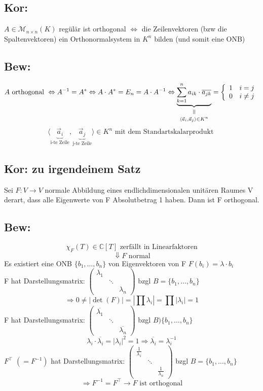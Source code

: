 \documentclass[titlepage,12pt,a4paper,ngerman]{report}
\newcommand{\verteq}{\rotatebox{90}{$\,=$}}
\newcommand{\equalto}[2]{\underset{\scriptstyle\overset{\mkern4mu\verteq}{#2}}{#1}}
\newcommand{\tx}[1]{\textrm{#1}}
\newcommand{\ub}[1]{\underbrace{#1}}
\newcommand{\basis}[3]{\{#1_{#2}, \dots, #1_{#3}\}}
\newcommand{\casess}[4]{\left\{ \begin{array}{ll} {#1} & {#2} \\ {#3} & {#4} \end{array} \right.}
\newcommand{\ska}[2]{\langle #1 , #2 \rangle}
\begin{document}
\subsection{Kor:}
$ A \in \mathcal{M}_{n \times n} (K) $ regülär ist orthogonal $ \Leftrightarrow $ die  Zeilenvektoren (bzw die Spaltenvektoren) ein Orthonormalsystem in $ K^n $ bilden (und somit eine ONB)
\subsection{Bew:}
$$ A \tx{ orthogonal } \Leftrightarrow A^{-1} = A^* \Leftrightarrow A \cdot A^* = E_n = A \cdot A^{-1} \Leftrightarrow \equalto{\ub{\sum_{k=1}^{n} a_{ik} \cdot \overline{a_{jk}}}}{\ska{\vec{a}_i}{\vec{a}_j} \in K^n} = \casess{1}{i=j}{0}{i\neq j} $$
$$\ska{\ub{\vec{a}_i}_{\tx{i-te Zeile}}}{\ub{\vec{a}_j}_{\tx{j-te Zeile}}} \in K^n \tx{ mit dem Standartskalarprodukt } $$
\subsection{Kor: zu irgendeinem Satz}
Sei $ F: V \to V $ normale Abbildung eines endlichdimensionalen unitären Raumes V derart, dass alle Eigenwerte von F Absolutbetrag 1 haben. Dann ist F orthogonal.

\subsection{Bew:}
$$ \chi_{F}(T) \in \mathbb{C} [T] \tx{ zerfällt in Linearfaktoren}$$
$$\Downarrow F \tx{ normal}$$
Es existiert eine ONB $ \basis{b}{1}{n} $ von Eigenvektoren von F $ F(b_i) = \lambda \cdot b_i $\\[5pt]
F hat Darstellungsmatrix:
$\begin{pmatrix}
\lambda_1\\
& \ddots \\
& & \lambda_n
\end{pmatrix} $
bzgl $ B = \basis{b}{1}{n} $\\[5pt]
$$\Rightarrow 0 \neq |\det(F)| = | \prod  \lambda_i | = \prod | \lambda_i| = 1$$
F hat Darstellungsmatrix:
$\begin{pmatrix}
\overline{\lambda_1}\\
& \ddots \\
& & \overline{\lambda_n}
\end{pmatrix}$
bzgl $ B ) \basis{b}{1}{n} $\\[5pt]
$$\lambda_i \cdot \overline{\lambda_i} = |\lambda_i|^2 = 1 \Rightarrow \overline{\lambda_i} = \lambda_i^{-1}$$
$ F^\top $ $ (= F^{-1}) $ hat Darstellungsmatrix: $ \begin{pmatrix}
\frac{1}{\lambda_1} \\
& \ddots \\
& & \frac{1}{\lambda_n}
\end{pmatrix} $ bzgl $ B = \basis{b}{1}{n} $ 
$$\Rightarrow F^{-1} = F^\top \rightarrow F \tx{ ist orthogonal}$$
\end{document}
